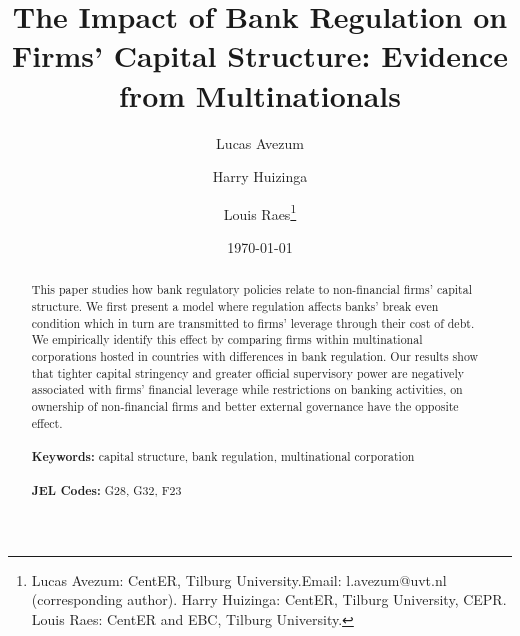 \documentclass[12pt]{article}
\begin{document}
	
	\begin{titlepage}
		\title{The Impact of Bank Regulation on  Firms' Capital Structure: Evidence from Multinationals}
		
		\author{Lucas Avezum \and Harry Huizinga \and Louis Raes\thanks{Lucas Avezum: CentER, Tilburg University.Email:
				l.avezum@uvt.nl (corresponding author). Harry Huizinga: CentER, Tilburg University, CEPR. Louis Raes: CentER and EBC, Tilburg University.}}
		\date{\today}
		\maketitle
		\begin{abstract}
			\noindent This paper studies how bank regulatory policies relate to non-financial firms' capital structure. We first present a model where regulation affects banks' break even condition which in turn are transmitted to firms' leverage through their cost of debt. We empirically identify this effect by comparing firms within multinational corporations hosted in countries with differences in bank regulation. Our results show that tighter capital stringency and greater official supervisory power are negatively associated with firms' financial leverage while restrictions on banking activities, on ownership of non-financial firms and better external governance have the opposite effect.  \\
			\vspace{0in}\\
			\noindent\textbf{Keywords:} capital structure, bank regulation, multinational corporation\\
			\vspace{0in}\\
			\noindent\textbf{JEL Codes:} G28, G32, F23 \\
			
			\bigskip
		\end{abstract}
		\setcounter{page}{0}
		\thispagestyle{empty}
	\end{titlepage}
	\pagebreak \newpage
	
	
	\normalem
	
	\doublespacing
	
	
\end{document}
